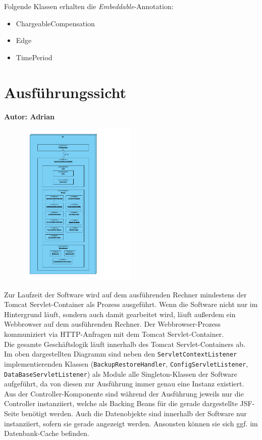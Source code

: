 \documentclass[fontsize=12pt,paper=a4,twoside]{scrartcl}
\begin{document}
Folgende Klassen erhalten die \textit{Embeddable}-Annotation:
\begin{itemize}
\item ChargeableCompensation
\item Edge
\item TimePeriod
\end{itemize}

\clearpage


\section{Ausführungssicht}
\label{sec:ausfuehrung}
\textbf{Autor: Adrian}\\

\begin{figure}[H]
\centering
\includegraphics[width=0.5\textwidth]{ausfuehrung.pdf}
\end{figure}
Zur Laufzeit der Software wird auf dem ausführenden Rechner mindestens der Tomcat Servlet-Container als Prozess ausgeführt. Wenn die Software nicht nur im Hintergrund läuft, sondern auch damit gearbeitet wird, läuft außerdem ein Webbrowser auf dem ausführenden Rechner. Der Webbrowser-Prozess kommuniziert via HTTP-Anfragen mit dem Tomcat Servlet-Container.\\
Die gesamte Geschäftslogik läuft innerhalb des Tomcat Servlet-Containers ab. \\
Im oben dargestellten Diagramm sind neben den \texttt{ServletContextListener} implementierenden Klassen (\texttt{BackupRestoreHandler}, \texttt{ConfigServletListener}, \texttt{DataBaseServletListener}) als Module alle Singleton-Klassen der Software aufgeführt, da von diesen zur Ausführung immer genau eine Instanz existiert. \\
Aus der Controller-Komponente sind während der Ausführung jeweils nur die Controller instanziiert, welche als Backing Beans für die gerade dargestellte JSF-Seite benötigt werden. Auch die Datenobjekte sind innerhalb der Software nur instanziiert, sofern sie gerade angezeigt werden. Ansonsten können sie sich ggf. im Datenbank-Cache befinden.
\end{document}
